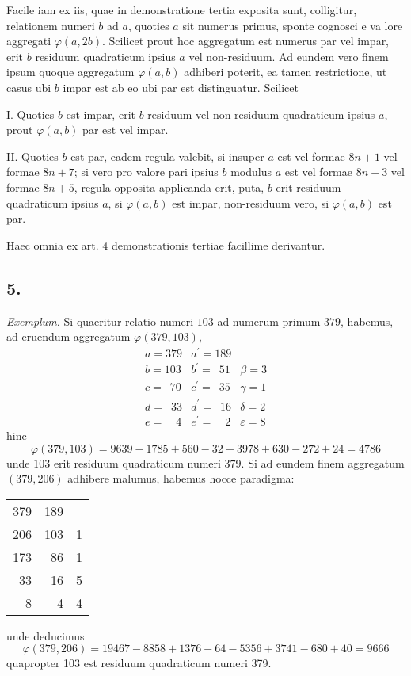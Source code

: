 \documentclass[twoside,12pt]{memoir}
\begin{document}
Facile iam ex iis, quae in demonstratione tertia exposita sunt, colligitur, relationem numeri \(b\) ad \(a\), quoties \(a\) sit numerus primus, sponte cognosci e va\pagebreak%
lore aggregati \(\varphi(a, 2 b)\). Scilicet prout hoc aggregatum est numerus par vel impar, erit \(b\) residuum quadraticum ipsius \(a\) vel non-residuum. Ad eundem vero finem ipsum quoque aggregatum \(\varphi(a, b)\) adhiberi poterit, ea tamen restrictione, ut casus ubi \(b\) impar est ab eo ubi par est distinguatur. Scilicet
 
I. Quoties \(b\) est impar, erit \(b\) residuum vel non-residuum quadraticum ipsius \(a\), prout \(\varphi(a, b)\) par est vel impar.
 
II. Quoties \(b\) est par, eadem regula valebit, si insuper \(a\) est vel formae \(8 n+1\) vel formae \(8 n+7\); si vero pro valore pari ipsius \(b\) modulus \(a\) est vel formae \(8 n+3\) vel formae \(8 n+5\), regula opposita applicanda erit, puta, \(b\) erit residuum quadraticum ipsius \(a\), si \(\varphi(a, b)\) est impar, non-residuum vero, si \(\varphi(a, b)\) est par.
 
Haec omnia ex art. 4 demonstrationis tertiae facillime derivantur.

\subsection*{5.}
 
\textit{Exemplum.} Si quaeritur relatio numeri \(103\) ad numerum primum \(379\), habemus, ad eruendum aggregatum \(\varphi(379,103)\),
\[\begin{array}{r|r|r}
a= 379 & a^{\prime}=189 & \\
b= 103 & b^{\prime}=\phantom{0}51 & \beta=3 \\
c= \phantom{0}70 & c^{\prime}=\phantom{0}35 & \gamma=1 \\
d= \phantom{0}33 & d^{\prime}=\phantom{0}16 & \delta=2 \\
e= \phantom{00}4 & e^{\prime}=\phantom{00}2 & \varepsilon=8
\end{array}\]
hinc
\[\varphi(379,103)=9639-1785+560-32-3978+630-272+24=4786\]
unde \(103\) erit residuum quadraticum numeri \(379\). Si ad eundem finem aggregatum \((379,206)\) adhibere malumus, habemus hocce paradigma:
\begin{center}
\begin{tabular}{r|r|r}
379 & 189 &  \\
206 & 103 & 1 \\
173 & 86 & 1 \\
33 & 16 & 5 \\
8 & 4 & 4 \\
\end{tabular}
\end{center}
unde deducimus\pagebreak%
\[\varphi(379,206)=19467-8858+1376-64-5356+3741-680+40=9666\]
quapropter 103 est residuum quadraticum numeri 379.
\end{document}
